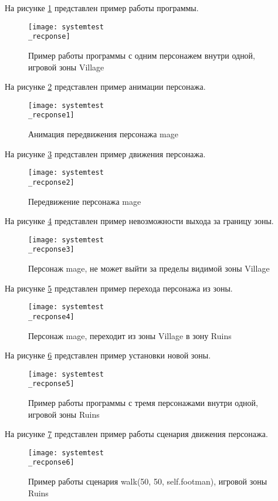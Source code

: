 На рисунке \ref{systemtest_recponse:image} представлен пример работы программы.
\begin{figure}[H]
	\centering
	\texttt{[image: systemtest\\\_recponse]}
	\caption{Пример работы программы с одним персонажем внутри одной, игровой зоны Village}
	\label{systemtest_recponse:image}
\end{figure}

На рисунке \ref{systemtest_recponse1:image} представлен пример анимации персонажа.
\begin{figure}[H]
	\centering
	\texttt{[image: systemtest\\\_recponse1]}
	\caption{Анимация передвижения персонажа mage}
	\label{systemtest_recponse1:image}
\end{figure}

На рисунке \ref{systemtest_recponse2:image} представлен пример движения персонажа.
\begin{figure}[H]
	\centering
	\texttt{[image: systemtest\\\_recponse2]}
	\caption{Передвижение персонажа mage}
	\label{systemtest_recponse2:image}
\end{figure}

На рисунке \ref{systemtest_recponse3:image} представлен пример невозможности выхода за границу зоны.
\begin{figure}[H]
	\centering
	\texttt{[image: systemtest\\\_recponse3]}
	\caption{Персонаж mage, не может выйти за пределы видимой зоны Village}
	\label{systemtest_recponse3:image}
\end{figure}

На рисунке \ref{systemtest_recponse4:image} представлен пример перехода персонажа из зоны.
\begin{figure}[H]
	\centering
	\texttt{[image: systemtest\\\_recponse4]}
	\caption{Персонаж mage, переходит из зоны Village в зону Ruins}
	\label{systemtest_recponse4:image}
\end{figure}

На рисунке \ref{systemtest_recponse5:image} представлен пример установки новой зоны.
\begin{figure}[H]
	\centering
	\texttt{[image: systemtest\\\_recponse5]}
	\caption{Пример работы программы с тремя персонажами внутри одной, игровой зоны Ruins}
	\label{systemtest_recponse5:image}
\end{figure}

На рисунке \ref{systemtest_recponse6:image} представлен пример работы сценария движения персонажа.
\begin{figure}[H]
	\centering
	\texttt{[image: systemtest\\\_recponse6]}
	\caption{Пример работы сценария walk(50, 50, self.footman), игровой зоны Ruins}
	\label{systemtest_recponse6:image}
\end{figure}

